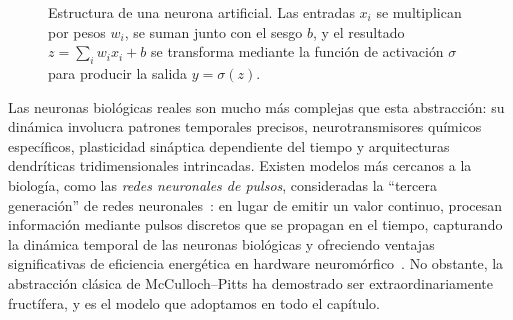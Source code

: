 \begin{figure}[h]
\centering
{}
\caption[Estructura de una neurona artificial]{Estructura de una neurona
artificial. Las entradas $x_i$ se multiplican por pesos $w_i$, se suman junto con
el sesgo $b$, y el resultado $z = \sum_i w_i x_i + b$ se transforma mediante la
funci\'on de activaci\'on $\sigma$ para producir la salida $y = \sigma(z)$.}
\label{fig:found:neuron}
\end{figure}

Las neuronas biol\'ogicas reales son mucho m\'as complejas que esta abstracci\'on:
su din\'amica involucra patrones temporales precisos, neurotransmisores qu\'imicos
espec\'ificos, plasticidad sin\'aptica dependiente del tiempo y arquitecturas
dendr\'iticas tridimensionales intrincadas. Existen modelos m\'as cercanos a la
biolog\'ia, como las \emph{redes neuronales de pulsos}, consideradas la ``tercera
generaci\'on'' de redes neuronales~\citep{Maass1997spiking}: en lugar de emitir un
valor continuo, procesan informaci\'on mediante pulsos discretos que se propagan
en el tiempo, capturando la din\'amica temporal de las neuronas biol\'ogicas y
ofreciendo ventajas significativas de eficiencia energ\'etica en hardware
neurom\'orfico~\citep{Tavanaei2018deep}. No obstante, la abstracci\'on cl\'asica de
McCulloch--Pitts ha demostrado ser extraordinariamente fruct\'ifera, y es el
modelo que adoptamos en todo el cap\'itulo.

